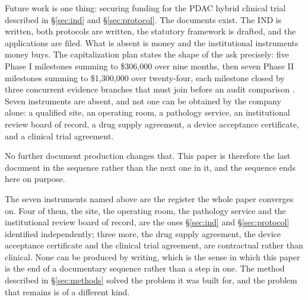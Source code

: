 Future work is one thing: securing funding for the PDAC hybrid clinical trial
described in \S\ref{sec:ind} and \S\ref{sec:protocol}. The documents exist. The IND is written, both
protocols are written, the statutory framework is drafted, and the applications
are filed. What is absent is money and the institutional instruments money buys.
The capitalization plan states the shape of the ask precisely: five Phase I
milestones summing to \$306,000 over nine months, then seven Phase II milestones
summing to \$1,300,000 over twenty-four, each milestone closed by three
concurrent evidence branches that must join before an audit comparison
\cite{capplan2026}. Seven instruments are absent, and not one can be obtained by
the company alone: a qualified site, an operating room, a pathology service, an
institutional review board of record, a drug supply agreement, a device
acceptance certificate, and a clinical trial agreement.

No further document production changes that. This paper is therefore the last
document in the sequence rather than the next one in it, and the sequence ends
here on purpose.

The seven instruments named above are the register the whole paper converges on.
Four of them, the site, the operating room, the pathology service and the
institutional review board of record, are the ones \S\ref{sec:ind} and
\S\ref{sec:protocol} identified independently; three more, the drug supply
agreement, the device acceptance certificate and the clinical trial agreement,
are contractual rather than clinical. None can be produced by writing, which is
the sense in which this paper is the end of a documentary sequence rather than a
step in one. The method described in \S\ref{sec:methods} solved the problem it
was built for, and the problem that remains is of a different kind.
